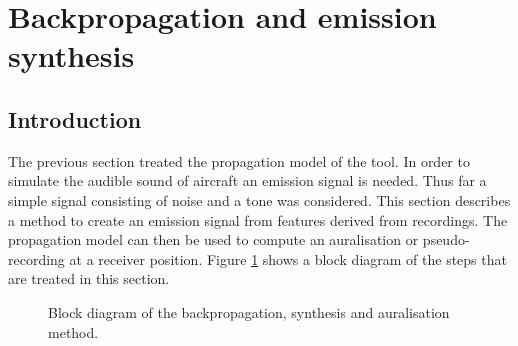 \section{Backpropagation and emission synthesis}\label{sec:tool:synthesis}

\subsection{Introduction}
The previous section treated the propagation model of the tool. In order to
simulate the audible sound of aircraft an emission signal is needed. Thus far a
simple signal consisting of noise and a tone was considered. This section
describes a method to create an emission signal from features derived from
recordings. The propagation model can then be used to compute an auralisation or
pseudo-recording at a receiver position. Figure
\ref{fig:tool:backpropagation:introduction:block-diagram} shows a block diagram of
the steps that are treated in this section.

\begin{figure}[H]
  \centering
{}
  \caption{Block diagram of the backpropagation, synthesis and auralisation method.}
  \label{fig:tool:backpropagation:introduction:block-diagram}
\end{figure}


